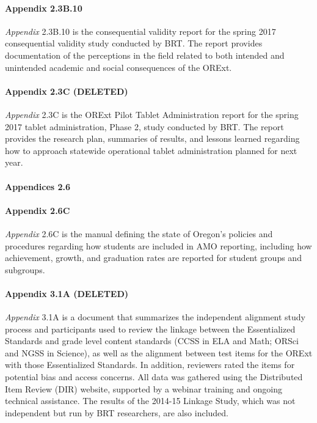\documentclass[]{article}
\let\oldparagraph\paragraph
\renewcommand{\paragraph}[1]{\oldparagraph{#1}\mbox{}}
\begin{document}
\paragraph{Appendix 2.3B.10}\label{appendix-2.3b.10}

\emph{Appendix} 2.3B.10 is the consequential validity report for the
spring 2017 consequential validity study conducted by BRT. The report
provides documentation of the perceptions in the field related to both
intended and unintended academic and social consequences of the ORExt.

\paragraph{Appendix 2.3C (DELETED)}\label{appendix-2.3c-deleted}

\emph{Appendix} 2.3C is the ORExt Pilot Tablet Administration report for
the spring 2017 tablet administration, Phase 2, study conducted by BRT.
The report provides the research plan, summaries of results, and lessons
learned regarding how to approach statewide operational tablet
administration planned for next year.

\paragraph{Appendices 2.6}\label{appendices-2.6}

\paragraph{Appendix 2.6C}\label{appendix-2.6c}

\emph{Appendix} 2.6C is the manual defining the state of Oregon's
policies and procedures regarding how students are included in AMO
reporting, including how achievement, growth, and graduation rates are
reported for student groups and subgroups.

\paragraph{Appendix 3.1A (DELETED)}\label{appendix-3.1a-deleted}

\emph{Appendix} 3.1A is a document that summarizes the independent
alignment study process and participants used to review the linkage
between the Essentialized Standards and grade level content standards
(CCSS in ELA and Math; ORSci and NGSS in Science), as well as the
alignment between test items for the ORExt with those Essentialized
Standards. In addition, reviewers rated the items for potential bias and
access concerns. All data was gathered using the Distributed Item Review
(DIR) website, supported by a webinar training and ongoing technical
assistance. The results of the 2014-15 Linkage Study, which was not
independent but run by BRT researchers, are also included.
\end{document}
